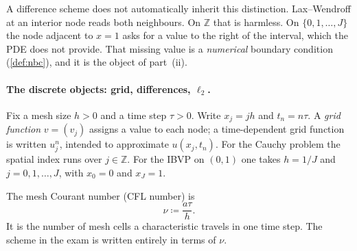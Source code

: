 \begin{center}
\end{center}

A difference scheme does not automatically inherit this distinction. Lax--Wendroff at an interior node reads both neighbours. On \(\mathbb{Z}\) that is harmless. On \(\{0,1,\dots,J\}\) the node adjacent to \(x=1\) asks for a value to the right of the interval, which the PDE does not provide. That missing value is a \emph{numerical} boundary condition (\cref{def:nbc}), and it is the object of part~(ii).

\paragraph{The discrete objects: grid, differences, \(\ell_2\).}

\begin{notation}
\label{not:grid-p5}
Fix a mesh size \(h>0\) and a time step \(\tau>0\). Write \(x_j=jh\) and \(t_n=n\tau\). A \emph{grid function} \(v=(v_j)\) assigns a value to each node; a time-dependent grid function is written \(u_j^n\), intended to approximate \(u(x_j,t_n)\). For the Cauchy problem the spatial index runs over \(j\in\mathbb{Z}\). For the IBVP on \((0,1)\) one takes \(h=1/J\) and \(j=0,1,\dots,J\), with \(x_0=0\) and \(x_J=1\).

The mesh Courant number (CFL number) is
\[
\nu
\coloneqq
\frac{a\tau}{h}.
\]
It is the number of mesh cells a characteristic travels in one time step. The scheme in the exam is written entirely in terms of \(\nu\).
\end{notation}

